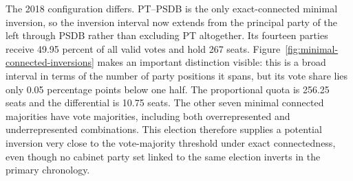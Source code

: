 \documentclass[11pt]{article}
\begin{document}

The 2018 configuration differs. PT--PSDB is the only exact-connected
minimal inversion, so the inversion interval now extends from the
principal party of the left through PSDB rather than excluding PT
altogether. Its fourteen parties receive 49.95 percent of all valid votes
and hold 267 seats. Figure~\ref{fig:minimal-connected-inversions} makes an
important distinction visible: this is a broad interval in terms of the
number of party positions it spans, but its vote share lies only 0.05
percentage points below one half. The
proportional quota is 256.25 seats and the differential is 10.75 seats.
The other seven minimal connected majorities have vote majorities,
including both overrepresented and underrepresented combinations. This
election therefore supplies a potential inversion very close to the
vote-majority threshold under exact connectedness, even though no cabinet
party set linked to the same election inverts in the primary chronology.
\end{document}
